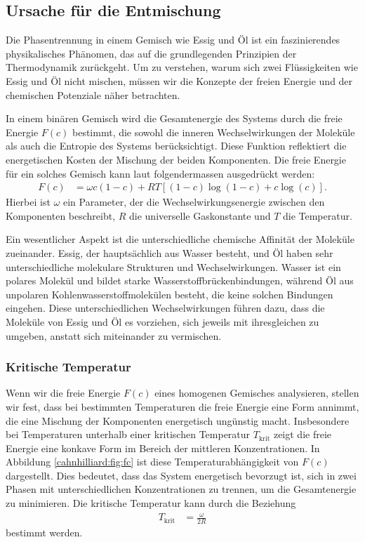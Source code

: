 \subsection{Ursache für die Entmischung}

Die Phasentrennung in einem Gemisch wie Essig und Öl
ist ein faszinierendes physikalisches Phänomen,
das auf die grundlegenden Prinzipien der Thermodynamik zurückgeht.
Um zu verstehen,
warum sich zwei Flüssigkeiten wie Essig und Öl nicht mischen,
müssen wir die Konzepte der freien Energie und
der chemischen Potenziale näher betrachten.

In einem binären Gemisch wird die Gesamtenergie des Systems
durch die freie Energie $F(c)$ bestimmt,
die sowohl die inneren Wechselwirkungen der Moleküle
als auch die Entropie des Systems berücksichtigt.
Diese Funktion reflektiert die energetischen Kosten der Mischung der beiden Komponenten.
Die freie Energie für ein solches Gemisch kann laut \cite{cahnhilliard:deriv}
folgendermassen ausgedrückt werden:
\begin{align*}
F(c)
&=
\omega c (1 - c) + R T \left[ (1-c) \log(1-c) + c \log(c) \right].
\end{align*}
Hierbei ist $\omega$ ein Parameter,
der die Wechselwirkungsenergie zwischen den Komponenten beschreibt,
$R$ die universelle Gaskonstante und
$T$ die Temperatur.

Ein wesentlicher Aspekt ist die unterschiedliche chemische Affinität
der Moleküle zueinander.
Essig,
der hauptsächlich aus Wasser besteht,
und Öl haben sehr unterschiedliche molekulare Strukturen und Wechselwirkungen.
Wasser ist ein polares Molekül und bildet starke Wasserstoffbrückenbindungen,
während Öl aus unpolaren Kohlenwasserstoffmolekülen besteht,
die keine solchen Bindungen eingehen.
Diese unterschiedlichen Wechselwirkungen führen dazu,
dass die Moleküle von Essig und Öl es vorziehen,
sich jeweils mit ihresgleichen zu umgeben,
anstatt sich miteinander zu vermischen.

\subsubsection{Kritische Temperatur}
Wenn wir die freie Energie $F(c)$ eines homogenen Gemisches analysieren,
stellen wir fest,
dass bei bestimmten Temperaturen die freie Energie eine Form annimmt,
die eine Mischung der Komponenten energetisch ungünstig macht.
Insbesondere bei Temperaturen unterhalb einer kritischen Temperatur $T_\text{krit}$
zeigt die freie Energie eine konkave Form im Bereich der mittleren Konzentrationen.
In Abbildung \ref{cahnhilliard:fig:fc}
ist diese Temperaturabhängigkeit von $F(c)$ dargestellt.
Dies bedeutet,
dass das System energetisch bevorzugt ist,
sich in zwei Phasen mit unterschiedlichen Konzentrationen zu trennen,
um die Gesamtenergie zu minimieren.
Die kritische Temperatur kann durch die Beziehung
\begin{align*}
T_\text{krit}
&=
\frac{\omega}{2 R}
\end{align*}
bestimmt werden.

